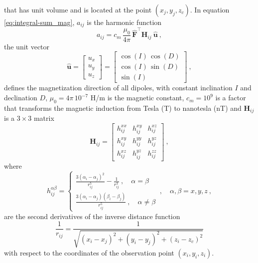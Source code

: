 \documentclass[manuscript,noblind]{geophysics}
\begin{document}
that has unit volume and is located at the point $(x_{j}, y_{j}, z_{c})$. In equation
\ref{eq:integral-sum_mag}, $a_{ij}$ is the harmonic function
\begin{equation}
	a_{ij}
	= c_{m} \, \frac{\mu_{0}}{4\pi} \, \hat{\mathbf{F}}^{\top} \mathbf{H}_{ij} \: \hat{\mathbf{u}} \: ,
	\label{eq:aij_mag}
\end{equation}
the unit vector
\begin{equation}
	\hat{\mathbf{u}} = \begin{bmatrix}
		u_x \\
		u_y \\
		u_z
	\end{bmatrix} =
	\begin{bmatrix}
		\cos(I) \, \cos(D) \\
		\cos(I) \, \sin(D) \\
		\sin(I)
	\end{bmatrix} \: ,
	\label{eq:u_hat}
\end{equation}
defines the magnetization direction of all dipoles, with constant inclination $I$ and declination $D$,
$\mu_{0} = 4\pi \, 10^{-7}$ H/m is the magnetic constant, $c_{m} = 10^{9}$ is a factor that transforms
the magnetic induction from Tesla (T) to nanotesla (nT) and $\mathbf{H}_{ij}$ is a $3 \times 3$ matrix 
\begin{equation}
	\mathbf{H}_{ij} = \begin{bmatrix}
		h^{xx}_{ij} & h^{xy}_{ij} & h^{xz}_{ij} \\
		h^{xy}_{ij} & h^{yy}_{ij} & h^{yz}_{ij} \\
		h^{xz}_{ij} & h^{yz}_{ij} & h^{zz}_{ij}
	\end{bmatrix} \: ,
	\label{eq:Hij}
\end{equation}
where 
\begin{equation}
	h^{\alpha\beta}_{ij} = 
	\begin{cases}
		\frac{3 \left( \alpha_{i} - \alpha_{j} \right)^{2}}{r_{ij}^{5}} - \frac{1}{r_{ij}^{3}} \: , \quad \alpha = \beta \\
		\frac{3 \left( \alpha_{i} - \alpha_{j} \right) \left( \beta_{i} - \beta_{j} \right)}{r_{ij}^{5}} \: , \quad \alpha \ne \beta
	\end{cases} \: , \quad \alpha, \beta = x, y, z \: ,
	\label{eq:hij_alpha_beta}
\end{equation}
are the second derivatives of the inverse distance function
\begin{equation}
	\frac{1}{r_{ij}} = 
	\frac{1}{\sqrt{\left(x_{i} - x_{j} \right)^{2} + 
			\left(y_{i} - y_{j} \right)^{2} + \left(z_{i} - z_{c} \right)^{2}}}
	\label{eq:1_rij}
\end{equation}
with respect to the coordinates of the observation point $(x_{i}, y_{i}, z_{i})$.
\end{document}
